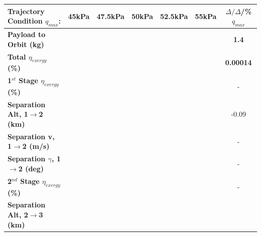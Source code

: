 \begin{table}[ht]%
	\centering
	\begin{tabular}{l c c c c c c} 
		\hline \textbf{Trajectory Condition}   \qquad  $q_{max}$:
		&45kPa
		&47.5kPa
		&50kPa
		&52.5kPa
		&55kPa
		& $\Delta/\Delta$/\%$q_{max}$
			\\
			\hline \textbf{Payload to Orbit (kg)}
			& \textbf{\PayloadToOrbitqForty}
			& \textbf{\PayloadToOrbitqFortyFive}
			& \textbf{\PayloadToOrbitqStandard}
			& \textbf{\PayloadToOrbitqFiftyFive}
			& \textbf{\PayloadToOrbitqSixty}
			&\textbf{1.4}
			\\
			\textbf{Total $\eta_{exergy}$ (\%)}
			& \textbf{\totalExergyEffqForty}
			& \textbf{\totalExergyEffqFortyFive}
			& \textbf{\totalExergyEffqStandard}
			& \textbf{\totalExergyEffqFiftyFive}
			& \textbf{\totalExergyEffqSixty}
			& \textbf{0.00014}
			\\
			\hline 
			\textbf{1$^{st}$ Stage $\eta_{exergy}$ (\%)}
			& \textbf{\firstExergyEffqForty}
			& \textbf{\firstExergyEffqFortyFive}
			& \textbf{\firstExergyEffqStandard}
			& \textbf{\firstExergyEffqFiftyFive}
			& \textbf{\firstExergyEffqSixty}
			& -
			\\
			\textbf{Separation Alt, 1$\rightarrow$2 (km)}
			& \firstsecondSeparationAltqForty
			& \firstsecondSeparationAltqFortyFive
			& \firstsecondSeparationAltqStandard
			& \firstsecondSeparationAltqFiftyFive
			& \firstsecondSeparationAltqSixty
			&-0.09
			\\
			\textbf{Separation v, 1$\rightarrow$2 (m/s)}
			& \firstsecondSeparationvqForty
			& \firstsecondSeparationvqFortyFive
			& \firstsecondSeparationvqStandard
			& \firstsecondSeparationvqFiftyFive
			& \firstsecondSeparationvqSixty
			& -
			\\
			\textbf{Separation $\gamma$, 1$\rightarrow$2 (deg)}
			& \firstsecondSeparationgammaqForty
			& \firstsecondSeparationgammaqFortyFive
			& \firstsecondSeparationgammaqStandard
			& \firstsecondSeparationgammaqFiftyFive
			& \firstsecondSeparationgammaqSixty
			& -
			\\
			\hline 
			\textbf{2$^{nd}$ Stage $\eta_{exergy}$ (\%)}
			& \textbf{\secondExergyEffqForty}
			& \textbf{\secondExergyEffqFortyFive}
			& \textbf{\secondExergyEffqStandard}
			& \textbf{\secondExergyEffqFiftyFive}
			& \textbf{\secondExergyEffqSixty}
			& -
			\\
			\textbf{Separation Alt, 2$\rightarrow$3 (km)}
			& \secondthirdSeparationAltqForty
			& \secondthirdSeparationAltqFortyFive
			& \secondthirdSeparationAltqStandard

\end{tabular}
\end{table}
